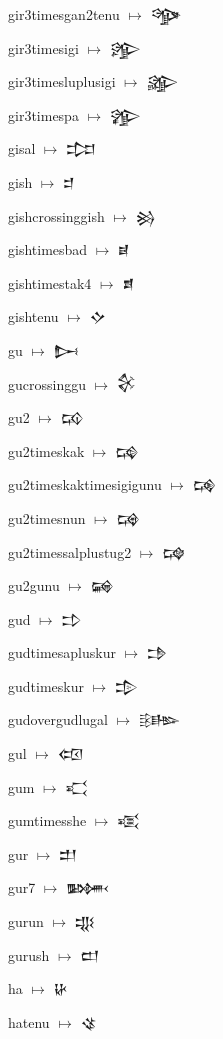 {\noindent gir3timesgan2tenu $\mapsto$ {\cufont 𒄌}\par
\noindent gir3timesigi $\mapsto$ {\cufont 𒄍}\par
\noindent gir3timesluplusigi $\mapsto$ {\cufont 𒄎}\par
\noindent gir3timespa $\mapsto$ {\cufont 𒄏}\par
\noindent gisal $\mapsto$ {\cufont 𒄐}\par
\noindent gish $\mapsto$ {\cufont 𒄑}\par
\noindent gishcrossinggish $\mapsto$ {\cufont 𒄒}\par
\noindent gishtimesbad $\mapsto$ {\cufont 𒄓}\par
\noindent gishtimestak4 $\mapsto$ {\cufont 𒄔}\par
\noindent gishtenu $\mapsto$ {\cufont 𒄕}\par
\noindent gu $\mapsto$ {\cufont 𒄖}\par
\noindent gucrossinggu $\mapsto$ {\cufont 𒄗}\par
\noindent gu2 $\mapsto$ {\cufont 𒄘}\par
\noindent gu2timeskak $\mapsto$ {\cufont 𒄙}\par
\noindent gu2timeskaktimesigigunu $\mapsto$ {\cufont 𒄚}\par
\noindent gu2timesnun $\mapsto$ {\cufont 𒄛}\par
\noindent gu2timessalplustug2 $\mapsto$ {\cufont 𒄜}\par
\noindent gu2gunu $\mapsto$ {\cufont 𒄝}\par
\noindent gud $\mapsto$ {\cufont 𒄞}\par
\noindent gudtimesapluskur $\mapsto$ {\cufont 𒄟}\par
\noindent gudtimeskur $\mapsto$ {\cufont 𒄠}\par
\noindent gudovergudlugal $\mapsto$ {\cufont 𒄡}\par
\noindent gul $\mapsto$ {\cufont 𒄢}\par
\noindent gum $\mapsto$ {\cufont 𒄣}\par
\noindent gumtimesshe $\mapsto$ {\cufont 𒄤}\par
\noindent gur $\mapsto$ {\cufont 𒄥}\par
\noindent gur7 $\mapsto$ {\cufont 𒄦}\par
\noindent gurun $\mapsto$ {\cufont 𒄧}\par
\noindent gurush $\mapsto$ {\cufont 𒄨}\par
\noindent ha $\mapsto$ {\cufont 𒄩}\par
\noindent hatenu $\mapsto$ {\cufont 𒄪}\par
}
